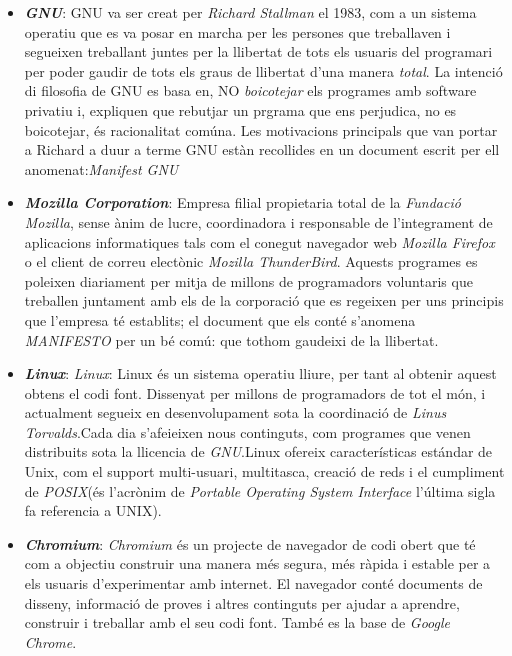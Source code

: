 \begin{itemize}

\item \textbf{\emph{GNU}}: GNU va ser creat per \textit{Richard Stallman} el 1983, com a un sistema operatiu que es va posar en marcha per les persones que treballaven i segueixen treballant juntes per la llibertat de tots els usuaris del programari per poder gaudir de tots els graus de llibertat d'una manera \textit{total}. La intenció di filosofia de GNU es basa en, NO \textit{boicotejar} els programes amb software privatiu i, expliquen que rebutjar un prgrama que ens perjudica, no es boicotejar, és racionalitat comúna. Les motivacions principals que van portar a Richard a duur a terme GNU estàn recollides en un document escrit per ell anomenat:\textit{Manifest GNU} \cite{GNUExit} \cite{GNUExitII} \cite{GNUMan} \cite{GvsM}

\item \textbf{\emph{Mozilla Corporation}}: Empresa filial propietaria total de la \emph{Fundació Mozilla}, sense ànim de lucre, coordinadora i responsable de l'integrament de aplicacions informatiques tals com el conegut navegador web \textit{Mozilla Firefox} o el client de correu electònic \textit{Mozilla ThunderBird}. Aquests programes es poleixen diariament per mitja de millons de programadors voluntaris que treballen juntament amb els de la corporació que es regeixen per uns principis que l'empresa té establits; el document que els conté s'anomena \emph{MANIFESTO} per un bé comú: que tothom gaudeixi de la llibertat. \cite{MozExit} \cite{MozExitII} \cite{MozFesto}

\item \textbf{\emph{Linux}}: \emph{Linux}: Linux és un sistema operatiu lliure, per tant al obtenir aquest obtens el codi font. Dissenyat per millons de programadors de tot el món, i actualment segueix en desenvolupament sota la coordinació de \emph{Linus Torvalds}.Cada dia s'afeieixen nous continguts, com programes que venen distribuits sota la llicencia de \emph{GNU}.Linux ofereix características estándar de Unix, com el support multi-usuari, multitasca, creació de reds i el cumpliment de \emph{POSIX}(és l'acrònim de \emph{Portable Operating System Interface} l'última sigla fa referencia a UNIX). \cite{LinExit} \cite{POSIX}

\item \textbf{\emph{Chromium}}: \emph{Chromium} és un projecte de navegador de codi obert que té com a objectiu construir una manera més segura, més ràpida i estable per a els usuaris d'experimentar amb internet. El navegador conté documents de disseny, informació de proves i altres continguts per ajudar a aprendre, construir i treballar amb el seu codi font. També es la base de \textit{Google Chrome}. \cite{Chrom} 
\end{itemize}












